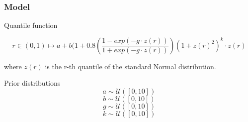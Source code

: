 \documentclass{beamer}
\begin{document}
\begin{frame}[plain]{}
	\sectionpage
\end{frame}
	\begin{frame}
		\frametitle{Model}
		\begin{block}{Quantile function}
			
			$$ r \in (0,1) \longmapsto   a + b (1+0.8\left(\frac{1-exp(-g \cdot z(r))}{1+exp(-g\cdot z(r))}\right)(1+ z(r)^{2})^k\cdot z(r)  $$
		\end{block}	
		where $ z(r)$ is the r-th quantile of the standard Normal distribution. 
		\begin{block}{Prior distributions}
			$$ a \sim \mathcal{U}([0,10])	$$
			$$ b \sim \mathcal{U}([0,10])	$$
			$$ g \sim \mathcal{U}([0,10])	$$
			$$k \sim \mathcal{U}([0,10])    $$
		\end{block}
	\end{frame}
	
	
	
\end{document}
